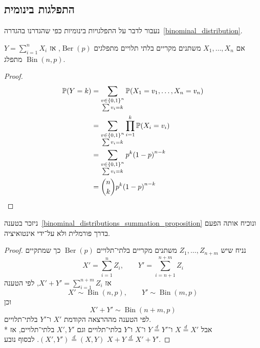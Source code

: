\subsection{התפלגות בינומית}
נעבור לדבר על התפלגויות בינומיות כפי שהגדרנו בהגדרה\ \ref{binominal_distribution}.
\begin{proposition}
	אם $X_1, \dots, X_n$ משתנים מקריים בלתי תלויים מתפלגים $\operatorname{Ber}(p)$, אז $Y = \sum_{i = 1}^n X_i$ מתפלג $\operatorname{Bin}(n, p)$.
\end{proposition}
\begin{proof}
	\begin{align*}
		\mathbb{P}(Y = k)
		& = \sum_{\substack{v \in {\{0, 1\}}^n \\ \sum v_i = k}} \mathbb{P}(X_1 = v_1, \dots, X_n = v_n) \\
		& = \sum_{\substack{v \in {\{0, 1\}}^n \\ \sum v_i = k}} \prod_{i = 1}^k \mathbb{P}(X_i = v_i) \\
		& = \sum_{\substack{v \in {\{0, 1\}}^n \\ \sum v_i = k}} p^k {(1 - p)}^{n - k} \\
		& = \binom{n}{k} p^k {(1 - p)}^{n - k}
	\end{align*}
\end{proof}
ניזכר בטענה\ \ref{binominal_distributions_summation_proposition} ונוכיח אותה הפעם בדרך פורמלית ולא על־ידי אינטואיציה.
\begin{proof}
	נניח שיש $Z_1, \dots, Z_{n + m}$ משתנים מקריים בלתי־תלויים $\operatorname{Ber}(p)$ כך שמתקיים
	\[
		X' = \sum_{i = 1}^n Z_i,
		\qquad
		Y' = \sum_{i = n + 1}^{n + m} Z_i
	\]
	אז $X' + Y' = \sum_{i = 1}^{n + m} Z_i$, לפי הטענה
	\[
		X' \sim \operatorname{Bin}(n, p),
		\qquad
		Y' \sim \operatorname{Bin}(m, p)
	\]
	וכן
	\[
		X' + Y' \sim \operatorname{Bin}(n + m, p)
	\]
	לפי הטענה מההרצאה הקודמת $X'$ ו־$Y'$ בלתי־תלויים. \\*
	אבל $X \overset{d}{=} X'$ ו־$Y \overset{d}{=} Y'$ ו־$X$ ו־$Y$ בלתי־תלויים וגם $X', Y'$ בלתי־תלויים, אז $(X', Y') \overset{d}{=} (X, Y)$.
	לבסוף נובע $X + Y \overset{d}{=} X' + Y'$.
\end{proof}

